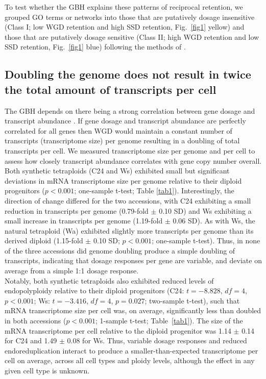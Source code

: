 \documentclass[11pt]{article}
\begin{document}
To test whether the GBH explains these patterns of reciprocal retention, we grouped GO terms or networks into those that are putatively dosage insensitive (Class I; low WGD retention and high SSD retention, Fig.~\ref{fig1} yellow) and those that are putatively dosage sensitive (Class II; high WGD retention and low SSD retention, Fig.~\ref{fig1} blue) following the methods of \cite{coate2016}.\\

\subsection*{Doubling the genome does not result in twice the total amount of transcripts per cell}
The GBH depends on there being a strong correlation between gene dosage and transcript abundance \citep{coate2016}.
If gene dosage and transcript abundance are perfectly correlated for all genes then WGD would maintain a constant number of transcripts (transcriptome size) per genome resulting in a doubling of total transcripts per cell.
We measured transcriptome size per genome and per cell to assess how closely transcript abundance correlates with gene copy number overall.\\

Both synthetic tetraploids (C24 and Ws) exhibited small but significant deviations in mRNA transcriptome size per genome relative to their diploid progenitors ($p < 0.001$; one-sample t-test; Table \ref{tab1}).
Interestingly, the direction of change differed for the two accessions, with C24 exhibiting a small reduction in transcripts per genome (0.79-fold $\pm$ 0.10 SD) and Ws exhibiting a small increase in transcripts per genome (1.19-fold $\pm$ 0.06 SD).
As with Ws, the natural tetraploid (Wa) exhibited slightly more transcripts per genome than its derived diploid (1.15-fold $\pm$ 0.10 SD; $p < 0.001$; one-sample t-test).
Thus, in none of the three accessions did genome doubling produce a simple doubling of transcripts, indicating that dosage responses per gene are variable, and deviate on average from a simple 1:1 dosage response.\\

Notably, both synthetic tetraploids also exhibited reduced levels of endopolyploidy relative to their diploid progenitors (C24: $t = -8.828$, $df = 4$, $p < 0.001$; Ws: $t = -3.416$, $df = 4$, $p = 0.027$; two-sample t-test), such that mRNA transcriptome size per cell was, on average, significantly less than doubled in both accessions ($p < 0.001$; 1-sample t-test; Table~\ref{tab1}).
The size of the mRNA transcriptome per cell relative to the diploid progenitor was 1.14 $\pm$ 0.14 for C24 and 1.49 $\pm$ 0.08 for Ws.
Thus, variable dosage responses and reduced endoreduplication interact to produce a smaller-than-expected transcriptome per cell on average, across all cell types and ploidy levels, although the effect in any given cell type is unknown.\\
\end{document}
